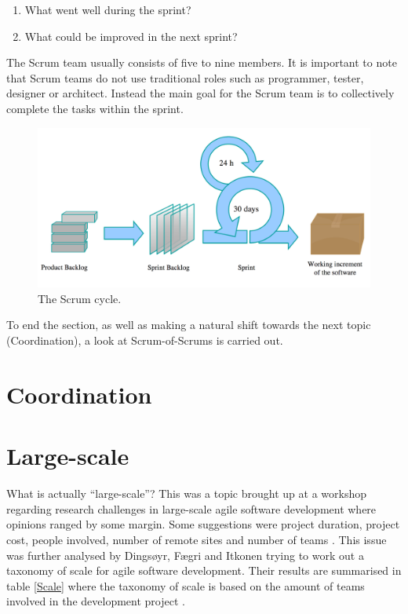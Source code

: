 \begin{enumerate}
  \item What went well during the sprint?
  \item What could be improved in the next sprint?
\end{enumerate}

The Scrum team usually consists of five to nine members. It is important to note that Scrum teams do not use traditional roles such as programmer, tester, designer or architect. Instead the main goal for the Scrum team is to collectively complete the tasks within the sprint.

\begin{figure}[ht!]
\centering
\includegraphics[width=150mm]{images/chapters/development_models/Scrum.png}
\caption{The Scrum cycle.}
\label{scrum}
\end{figure}

To end the section, as well as making a natural shift towards the next topic (Coordination), a look at Scrum-of-Scrums is carried out.


\section{Coordination}



\section{Large-scale}

What is actually ``large-scale''? This was a topic brought up at a workshop regarding research challenges in large-scale agile software development where opinions ranged by some margin. Some suggestions were project duration, project cost, people involved, number of remote sites and number of teams \cite{Dingsoyr2013b}. This issue was further analysed by Dingsøyr, Fægri and Itkonen trying to work out a taxonomy of scale for agile software development. Their results are summarised in table \ref{Scale} where the taxonomy of scale is based on the amount of teams involved in the development project \cite{Dingsoyr2013a}.

